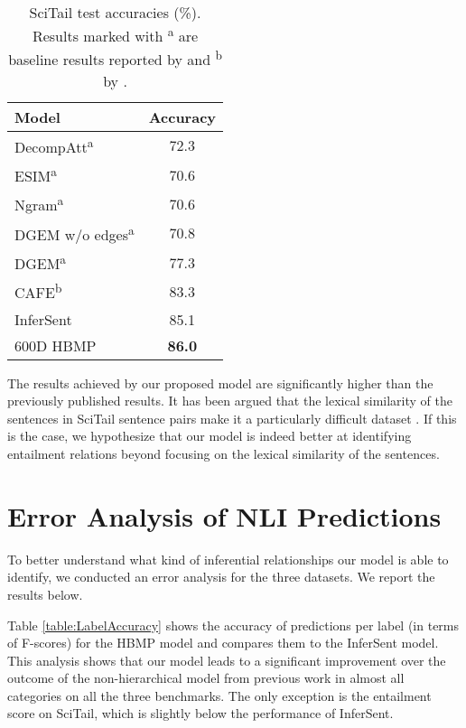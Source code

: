 \documentclass{nle}
\begin{document}
\begin{table}[h!]
\begin{small}
\begin{center}
\begin{tabular}{l c}
\hline \bf Model & \bf Accuracy \\ \hline
DecompAtt\textsuperscript{a} & 72.3\\
ESIM\textsuperscript{a} & 70.6 \\
Ngram\textsuperscript{a} & 70.6 \\
DGEM w/o edges\textsuperscript{a} & 70.8 \\
DGEM\textsuperscript{a} & 77.3 \\
CAFE\textsuperscript{b} & 83.3 \\
InferSent & 85.1 \\
\hline
600D HBMP & \bf 86.0 \\
\hline
\end{tabular}
\end{center}
\end{small}
\caption{\label{table:SciTailresults} SciTail test accuracies (\%).  Results marked with \textsuperscript{a} are baseline results reported by \cite{scitail} and \textsuperscript{b} by \cite{cafe}.}
\end{table}

The results achieved by our proposed model are significantly higher than the previously published results. It has been argued that the lexical similarity of the sentences in SciTail sentence pairs make it a particularly difficult dataset \citep{scitail}. If this is the case, we hypothesize that our model is indeed better at identifying entailment relations beyond focusing on the lexical similarity of the sentences.

\section{Error Analysis of NLI Predictions}

To better understand what kind of inferential relationships our model is able to identify, we conducted an error analysis for the three datasets. We report the results below.

Table \ref{table:LabelAccuracy} shows the accuracy of predictions per label (in terms of F-scores) for the HBMP model and compares them to the InferSent model. This analysis shows that our model leads to a significant improvement over the outcome of the non-hierarchical model from previous work in almost all categories on all the three benchmarks. The only exception is the entailment score on SciTail, which is slightly below the performance of InferSent.
\end{document}
